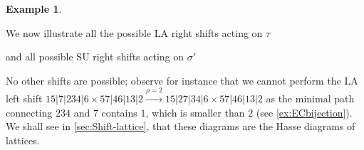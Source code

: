 \documentclass{amsart}
\theoremstyle{definition}
\newtheorem{example}[theorem]{Example}
\newcommand{\SU}{\mathrm{SU}}
\newcommand{\LA}{\mathrm{LA}}
\begin{document}
\begin{example}
\begin{center}
{\small
{}
\qquad
{}
}
\end{center}
We now illustrate all the possible $\LA$ right shifts acting on $\tau$
\begin{center}
\end{center}
and all possible $\SU$ right shifts acting on $\sigma'$
\begin{center}
\end{center}
No other shifts are possible; observe for instance that we cannot perform the $\LA$ left shift $15|7|234|6 \times 57|46|13|2 \xrightarrow{\rho=2} 15|27|34|6 \times 57|46|13|2$ as the minimal path connecting $234$ and $7$ contains $1$, which is smaller than $2$ (see \cref{ex:ECbijection}).
We shall see in \cref{sec:Shift-lattice}, that these diagrams are the Hasse diagrams of lattices.
\end{example}
\end{document}
